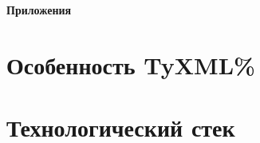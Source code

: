 


\appendix
{}
\newpage
\begin{center}
  \textbf{\large Приложения}
\end{center}

\section{Особенность TyXML\%}
\label{apx:tyxml_performance}


\section{Технологический стек}
\label{apx:versions}



